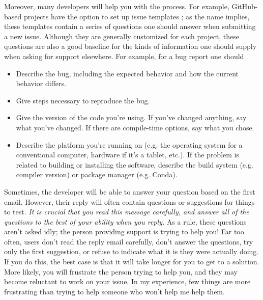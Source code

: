 \documentclass[9pt,training]{livecoms}
\begin{document}
Moreover, many developers will help you with the process. For example,
GitHub-based projects have the option to set up issue templates
\cite{github-templates}; as the name implies, these templates contain a series
of questions one should answer when submitting a new issue. Although they are
generally customized for each project, these questions are also a good baseline
for the kinds of information one should supply when asking for support
elsewhere. For example, for a bug report one should

\begin{itemize}

    \item Describe the bug, including the expected behavior and how the current
    behavior differs.

    \item Give steps necessary to reproduce the bug.

    \item Give the version of the code you're using. If you've changed anything,
    say what you've changed. If there are compile-time options, say what you
    chose.

    \item Describe the platform you're running on (e.g. the operating system for
    a conventional computer, hardware if it's a tablet, etc.). If the problem is
    related to building or installing the software, describe the build system
    (e.g. compiler version) or package manager (e.g. Conda\cite{ANACONDA}).

\end{itemize}

Sometimes, the developer will be able to answer your question based on the first
email. However, their reply will often contain questions or suggestions for
things to test. \emph{It is crucial that you read this message carefully, and
answer all of the questions to the best of your ability when you reply.} As a
rule, these questions aren't asked idly; the person providing support is trying
to help you! Far too often, users don't read the reply email carefully, don't
answer the questions, try only the first suggestion, or refuse to indicate what
it is they were actually doing. If you do this, the best case is that it will
take longer for you to get to a solution. More likely, you will frustrate the
person trying to help you, and they may become reluctant to work on your issue.
In my experience, few things are more frustrating than trying to help someone
who won't help me help them.
\end{document}
